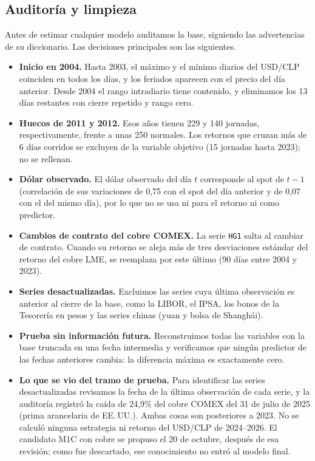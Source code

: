 \documentclass[11pt,a4paper]{article}
\begin{document}
\subsection{Auditoría y limpieza}\label{sec:auditoria}

Antes de estimar cualquier modelo auditamos la base, siguiendo las advertencias de su diccionario. Las decisiones principales son las siguientes.

\begin{itemize}\itemsep2pt
\item \textbf{Inicio en 2004.} Hasta 2003, el máximo y el mínimo diarios del USD/CLP coinciden en todos los días, y los feriados aparecen con el precio del día anterior. Desde 2004 el rango intradiario tiene contenido, y eliminamos los 13 días restantes con cierre repetido y rango cero.
\item \textbf{Huecos de 2011 y 2012.} Esos años tienen 229 y 140 jornadas, respectivamente, frente a unas 250 normales. Los retornos que cruzan más de 6 días corridos se excluyen de la variable objetivo (15 jornadas hasta 2023); no se rellenan.
\item \textbf{Dólar observado.} El dólar observado del día $t$ corresponde al spot de $t-1$ (correlación de sus variaciones de 0,75 con el spot del día anterior y de 0,07 con el del mismo día), por lo que no se usa ni para el retorno ni como predictor.
\item \textbf{Cambios de contrato del cobre COMEX.} La serie \texttt{HG1} salta al cambiar de contrato. Cuando su retorno se aleja más de tres desviaciones estándar del retorno del cobre LME, se reemplaza por este último (90 días entre 2004 y 2023).
\item \textbf{Series desactualizadas.} Excluimos las series cuya última observación es anterior al cierre de la base, como la LIBOR, el IPSA, los bonos de la Tesorería en pesos y las series chinas (yuan y bolsa de Shanghái).
\item \textbf{Prueba sin información futura.} Reconstruimos todas las variables con la base truncada en una fecha intermedia y verificamos que ningún predictor de las fechas anteriores cambia: la diferencia máxima es exactamente cero.
\item \textbf{Lo que se vio del tramo de prueba.} Para identificar las series desactualizadas revisamos la fecha de la última observación de cada serie, y la auditoría registró la caída de 24,9\% del cobre COMEX del 31 de julio de 2025 (prima arancelaria de EE.\,UU.). Ambas cosas son posteriores a 2023. No se calculó ninguna estrategia ni retorno del USD/CLP de 2024--2026. El candidato M1C con cobre se propuso el 20 de octubre, después de esa revisión; como fue descartado, ese conocimiento no entró al modelo final.
\end{itemize}
\end{document}
